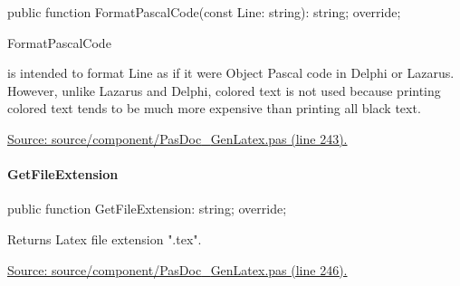 \documentclass{report}
\newif\ifpdf
\begin{document}
\label{PasDoc_GenLatex.TTexDocGenerator-FormatPascalCode}
\begin{list}{}{
\setlength{\itemindent}{0cm}
\setlength{\listparindent}{0cm}
\setlength{\leftmargin}{\evensidemargin}
\addtolength{\leftmargin}{\tmplength}
\settowidth{\labelsep}{X}
\addtolength{\leftmargin}{\labelsep}
\setlength{\labelwidth}{\tmplength}
}
\item[\textbf{Declaration}\hfill]
\ifpdf
\begin{flushleft}
\fi
\begin{ttfamily}
public function FormatPascalCode(const Line: string): string; override;\end{ttfamily}

\ifpdf
\end{flushleft}
\fi

\par
\item[\textbf{Description}]
\begin{ttfamily}FormatPascalCode\end{ttfamily} is intended to format Line as if it were Object Pascal code in Delphi or Lazarus. However, unlike Lazarus and Delphi, colored text is not used because printing colored text tends to be much more expensive than printing all black text.\par
\href{https://github.com/pasdoc/pasdoc/blob/master/source/component/PasDoc_GenLatex.pas#L243}{Source: source/component/PasDoc{\_}GenLatex.pas (line 243).}

\end{list}
\paragraph*{GetFileExtension}\hspace*{\fill}

\label{PasDoc_GenLatex.TTexDocGenerator-GetFileExtension}
\begin{list}{}{
\setlength{\itemindent}{0cm}
\setlength{\listparindent}{0cm}
\setlength{\leftmargin}{\evensidemargin}
\addtolength{\leftmargin}{\tmplength}
\settowidth{\labelsep}{X}
\addtolength{\leftmargin}{\labelsep}
\setlength{\labelwidth}{\tmplength}
}
\item[\textbf{Declaration}\hfill]
\ifpdf
\begin{flushleft}
\fi
\begin{ttfamily}
public function GetFileExtension: string; override;\end{ttfamily}

\ifpdf
\end{flushleft}
\fi

\par
\item[\textbf{Description}]
Returns Latex file extension ".tex".\par
\href{https://github.com/pasdoc/pasdoc/blob/master/source/component/PasDoc_GenLatex.pas#L246}{Source: source/component/PasDoc{\_}GenLatex.pas (line 246).}

\end{list}
\end{document}
